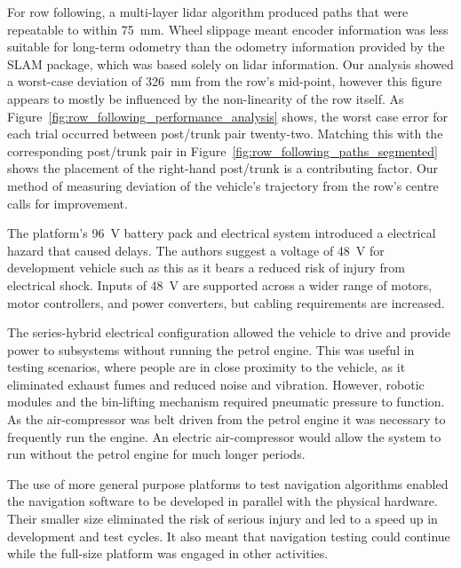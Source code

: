 \documentclass[preprint,authoryear,12pt]{elsarticle}
\begin{document}
    For row following, a multi-layer lidar algorithm produced paths that were repeatable to within \SI{75}{\milli\meter}.
    Wheel slippage meant encoder information was less suitable for long-term odometry than the odometry information provided by the SLAM package, which was based solely on lidar information.
    Our analysis showed a worst-case deviation of \SI{326}{\milli\meter} from the row's mid-point, however this figure appears to mostly be influenced by the non-linearity of the row itself.
    As Figure~\ref{fig:row_following_performance_analysis} shows, the worst case error for each trial occurred between post/trunk pair twenty-two.
    Matching this with the corresponding post/trunk pair in Figure~\ref{fig:row_following_paths_segmented} shows the placement of the right-hand post/trunk is a contributing factor.
    Our method of measuring deviation of the vehicle's trajectory from the row's centre calls for improvement.

    The platform's \SI{96}{\volt} battery pack and electrical system introduced a electrical hazard that caused delays.
    The authors suggest a voltage of \SI{48}{\volt} for development vehicle such as this as it bears a reduced risk of injury from electrical shock.
    Inputs of \SI{48}{\volt} are supported across a wider range of motors, motor controllers, and power converters, but cabling requirements are increased.

    The series-hybrid electrical configuration allowed the vehicle to drive and provide power to subsystems without running the petrol engine.
    This was useful in testing scenarios, where people are in close proximity to the vehicle, as it eliminated exhaust fumes and reduced noise and vibration.
    However, robotic modules and the bin-lifting mechanism required pneumatic pressure to function.
    As the air-compressor was belt driven from the petrol engine it was necessary to frequently run the engine.
    An electric air-compressor would allow the system to run without the petrol engine for much longer periods.

    The use of more general purpose platforms to test navigation algorithms enabled the navigation software to be developed in parallel with the physical hardware.
    Their smaller size eliminated the risk of serious injury and led to a speed up in development and test cycles.
    It also meant that navigation testing could continue while the full-size platform was engaged in other activities.

\end{document}
